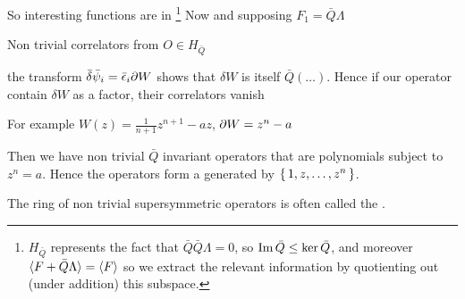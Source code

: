 \documentclass{article}
\begin{document}
So interesting functions are in 
\footnote{$H_{\bar{Q}}$ represents the fact that $\bar{Q}\bar{Q}\Lambda = 0$, so $\operatorname{Im} \bar{Q} \leq \ker \bar{Q}$, and moreover $\braket{F + \bar{Q} \Lambda} =  \braket{F}$ so we extract the relevant information by quotienting out (under addition) this subspace.} Now 
and supposing $F_1 = \bar{Q} \Lambda$


Non trivial correlators from $O \in H_{\bar{Q}}$

\begin{example}

 the transform $\bar{\delta}\bar{\psi}_i = \bar{\epsilon}_i \partial W$ shows that $\delta W$ is itself $\bar{Q}(\dots)$. Hence if our operator contain $\delta W$ as a factor, their correlators vanish 

For example $W(z) = \frac{1}{n+1} z^{n+1}-az$, $\partial W = z^n - a$

Then we have non trivial $\bar{Q}$ invariant operators that are polynomials subject to $z^n = a$. Hence the operators form a  generated by $\set{1,z,\dots,z^n}$. 

The ring of non trivial supersymmetric operators is often called the . 

\end{example}



\end{document}
